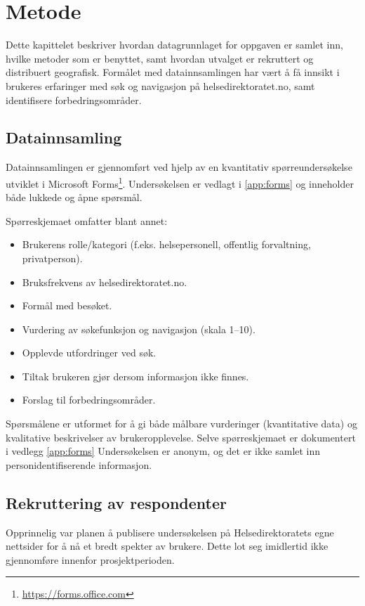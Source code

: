 \section{Metode}

Dette kapittelet beskriver hvordan datagrunnlaget for oppgaven er samlet inn, hvilke metoder som er benyttet, samt hvordan utvalget er rekruttert og distribuert geografisk. Formålet med datainnsamlingen har vært å få innsikt i brukeres erfaringer med søk og navigasjon på helsedirektoratet.no, samt identifisere forbedringsområder.

\subsection{Datainnsamling}

Datainnsamlingen er gjennomført ved hjelp av en kvantitativ spørreundersøkelse utviklet i Microsoft Forms\footnote{\url{https://forms.office.com}}. Undersøkelsen er vedlagt i \autoref{app:forms} og inneholder både lukkede og åpne spørsmål.

Spørreskjemaet omfatter blant annet:
\begin{itemize}
    \item Brukerens rolle/kategori (f.eks. helsepersonell, offentlig forvaltning, privatperson).
    \item Bruksfrekvens av helsedirektoratet.no.
    \item Formål med besøket.
    \item Vurdering av søkefunksjon og navigasjon (skala 1--10).
    \item Opplevde utfordringer ved søk.
    \item Tiltak brukeren gjør dersom informasjon ikke finnes.
    \item Forslag til forbedringsområder.
\end{itemize}

Spørsmålene er utformet for å gi både målbare vurderinger (kvantitative data) og kvalitative beskrivelser av brukeropplevelse. Selve spørreskjemaet er dokumentert i vedlegg \autoref{app:forms} 
Undersøkelsen er anonym, og det er ikke samlet inn personidentifiserende informasjon.

\subsection{Rekruttering av respondenter}

Opprinnelig var planen å publisere undersøkelsen på Helsedirektoratets egne nettsider for å nå et bredt spekter av brukere. Dette lot seg imidlertid ikke gjennomføre innenfor prosjektperioden.

